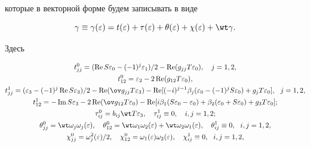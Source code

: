 которые в векторной форме будем записывать в виде 


$$ 


\gamma\equiv\gamma(\varepsilon)=t(\varepsilon)+ 


\tau(\varepsilon)+\theta(\varepsilon)+\chi(\varepsilon)+\wt\gamma. 


$$ 


Здесь 


\begin{gather} 


t^0_{jj}=(\re S\varepsilon_0-(-1)^j\varepsilon_1)/2- 


\re(g_{jj}T\varepsilon_0),\quad j=1,2,\notag \\ 


% 


t^0_{12}=\varepsilon_2-2\re(g_{12}T\varepsilon_0),\notag \\ 


% 


t^1_{jj}=(\varepsilon_3-(-1)^j\re S\varepsilon_3)/2- 


\re(\ov g_{jj}T\varepsilon_3)-\re[(-i)^{j-1} 


\beta_j(\varepsilon_0-(-1)^j S\varepsilon_0)+ 


g_j T\varepsilon_0],\ \ j=1,2,\\ 


% 


t^1_{12}=-\im S\varepsilon_3-2\re(\ov g_{12}T\varepsilon_0)- 


\re[i\beta_1(S\varepsilon_0-\varepsilon_0)+ 


\beta_2(\varepsilon_0+S\varepsilon_0)+ 


g_3 T\varepsilon_0];\notag \\ 


% 


\tau^0_{ij}=b_{ij}\wt T\varepsilon_3,\quad 


\tau^1_{ij}\equiv0,\quad i,j=1,2; \\ 


% 


\theta^0_{jj}=\wt\omega_j\omega_j(\varepsilon),\quad 


\theta^0_{12}=\wt\omega_1\omega_2(\varepsilon)+ 


\wt\omega_2\omega_1(\varepsilon),\quad 


\theta^1_{ij}\equiv0,\ \ i,j=1,2,\\ 


% 


\chi^0_{jj}=\omega^2_j(\varepsilon)/2,\quad 


\chi^0_{12}=\omega_1(\varepsilon)\omega_2(\varepsilon),\quad 


\chi^1_{ij}\equiv0,\ \ i,j=1,2, 


\end{gather} 


